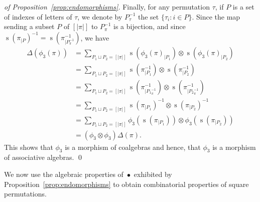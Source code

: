 \documentclass[a4paper]{llncs}
\DeclareMathOperator{\STD}{\mathrm{s}}
\DeclareMathOperator{\SHUFFLE}{\bullet}
\begin{document}
\begin{proof}[of Proposition~\ref{prop:endomorphisms}]
    Finally, for any permutation $\tau$, if $P$ is a set of indexes of
    letters of $\tau$, we denote by $P_\tau^{-1}$ the set
    $\{\tau_i : i \in P\}$. Since the map sending a subset $P$ of
    $[|\pi|]$ to $P_\pi^{-1}$ is a bijection, and since
    $\STD\left(\pi_{|P}\right)^{-1} = \STD\left(\pi^{-1}_{|P_\pi^{-1}}\right)$,
    we have
    \begin{equation} \begin{split}
        \Delta(\phi_3(\pi))
        & = \sum_{P_1 \sqcup P_2 = [|\pi|]}
        \STD\left(\phi_3(\pi)_{|P_1}\right)
        \otimes \STD\left(\phi_3(\pi)_{|P_2}\right) \\
        & = \sum_{P_1 \sqcup P_2 = [|\pi|]}
        \STD\left(\pi^{-1}_{|P_1}\right)
        \otimes \STD\left(\pi^{-1}_{|P_2}\right) \\
        & = \sum_{P_1 \sqcup P_2 = [|\pi|]}
        \STD\left(\pi^{-1}_{|{P_1}_\pi^{-1}}\right)
        \otimes \STD\left(\pi^{-1}_{|{P_2}_\pi^{-1}}\right) \\
        & = \sum_{P_1 \sqcup P_2 = [|\pi|]}
        \STD\left(\pi_{|P_1}\right)^{-1}
        \otimes \STD\left(\pi_{|P_2}\right)^{-1} \\
        & = \sum_{P_1 \sqcup P_2 = [|\pi|]}
        \phi_3\left(\STD\left(\pi_{|P_1}\right)\right)
        \otimes \phi_3\left(\STD\left(\pi_{|P_2}\right)\right) \\
        & = (\phi_3 \otimes \phi_3) \Delta(\pi).
    \end{split} \end{equation}
    This shows that $\phi_3$ is a morphism of coalgebras and hence, that
    $\phi_3$ is a morphism of associative algebras.
    \qed
\end{proof}
\medskip

We now use the algebraic properties of $\SHUFFLE$ exhibited by
Proposition~\ref{prop:endomorphisms} to obtain combinatorial properties
of square permutations.
\medskip
\end{document}
